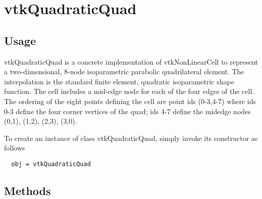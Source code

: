 \section{vtkQuadraticQuad}

\subsection{Usage}

 vtkQuadraticQuad is a concrete implementation of vtkNonLinearCell to
 represent a two-dimensional, 8-node isoparametric parabolic quadrilateral
 element. The interpolation is the standard finite element, quadratic
 isoparametric shape function. The cell includes a mid-edge node for each
 of the four edges of the cell. The ordering of the eight points defining
 the cell are point ids (0-3,4-7) where ids 0-3 define the four corner
 vertices of the quad; ids 4-7 define the midedge nodes (0,1), (1,2),
 (2,3), (3,0).

To create an instance of class vtkQuadraticQuad, simply
invoke its constructor as follows
\begin{verbatim}
  obj = vtkQuadraticQuad
\end{verbatim}
\subsection{Methods}

